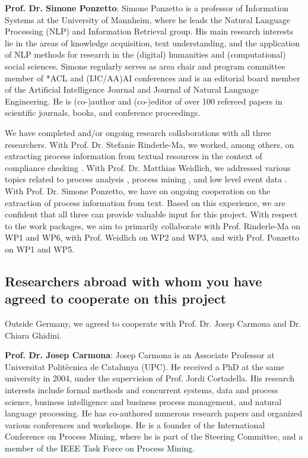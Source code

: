 \textbf{Prof. Dr. Simone Ponzetto}: Simone Ponzetto is a professor of Information Systems at the University of Mannheim, where he leads the Natural Language Processing (NLP) and Information Retrieval group. His main research interests lie in the areas of knowledge acquisition, text understanding, and the application of NLP methods for research in the (digital) humanities and (computational) social sciences. Simone regularly serves as area chair and program committee member of *ACL and (IJC/AA)AI conferences and is an editorial board member of the Artificial Intelligence Journal and Journal of Natural Language Engineering. He is (co-)author and (co-)editor of over 100 refereed papers in scientific journals, books, and conference proceedings.

We have completed and/or ongoing research collaborations with all three researchers.
With Prof. Dr. Stefanie Rinderle-Ma, we worked, among others, on extracting process information from textual resources in the context of compliance checking \cite{winter2020assessing}. 
With Prof. Dr. Matthias Weidlich, we addressed various topics related to process analysis \cite{leopold2012probabilistic,weidlich2013predicting}, process mining \cite{van2020partial,fahrenkrog2020pripel}, and low level event data \cite{zhao2021eires,busany2020interval}.
With Prof. Dr. Simone Ponzetto, we have on ongoing cooperation on  the extraction of process information from text. 
%
Based on this experience, we are confident that all three can provide valuable input for this project. With respect to the work packages, we aim to primarily collaborate with Prof. Rinderle-Ma on WP1 and WP6, with Prof. Weidlich on WP2 and WP3, and with Prof. Ponzetto on WP1 and WP5.


\subsection{Researchers abroad with whom you have agreed to cooperate on this project}
\label{sec:collab:abroad}

Outside Germany, we agreed to cooperate with Prof. Dr. Josep Carmona and Dr. Chiara Ghidini.

\textbf{Prof. Dr. Josep Carmona}: Josep Carmona is an Associate Professor at Universitat Politècnica de Catalunya (UPC). He received a PhD at the same university in 2004, under the supervision of Prof. Jordi Cortadella. His research interests include formal methods and concurrent systems, data and process science, business intelligence and business process management, and natural language processing. He has co-authored numerous research papers and organized various conferences and workshops. He is a founder of the International Conference on Process Mining, where he is part of the Steering Committee, and a member of the IEEE Task Force on Process Mining.

